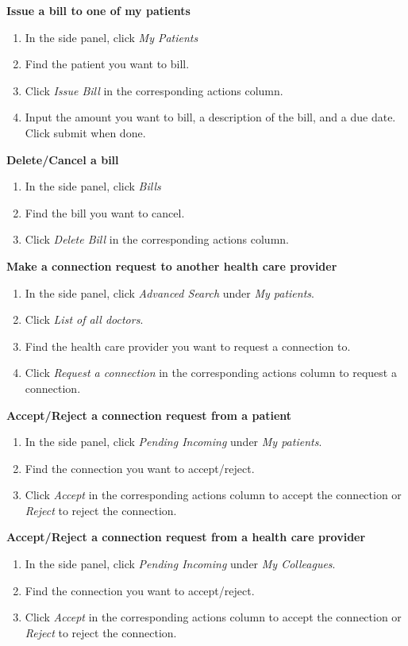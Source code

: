 \textbf{Issue a bill to one of my patients}
\begin{enumerate}
\item In the side panel, click \textit{My Patients}
\item Find the patient you want to bill. 
\item Click \textit{Issue Bill} in the corresponding actions column.
\item Input the amount you want to bill, a description of the bill, and a due date. Click submit when done.
\end{enumerate}
\textbf{Delete/Cancel a bill}
\begin{enumerate}
\item In the side panel, click \textit{Bills}
\item Find the bill you want to cancel.
\item Click \textit{Delete Bill} in the corresponding actions column.
\end{enumerate}
\textbf{Make a connection request to another health care provider}
\begin{enumerate}
\item In the side panel, click \textit{Advanced Search} under \textit{My patients}.
\item Click \textit{List of all doctors}.
\item Find the health care provider you want to request a connection to.
\item Click \textit{Request a connection} in the corresponding actions column to request a connection.
\end{enumerate}
\textbf{Accept/Reject a connection request from a patient}
\begin{enumerate}
\item In the side panel, click \textit{Pending Incoming} under \textit{My patients}.
\item Find the connection you want to accept/reject.
\item Click \textit{Accept} in the corresponding actions column to accept the connection or \textit{Reject} to reject the connection.
\end{enumerate}
\textbf{Accept/Reject a connection request from a health care provider}
\begin{enumerate}
\item In the side panel, click \textit{Pending Incoming} under \textit{My Colleagues}.
\item Find the connection you want to accept/reject.
\item Click \textit{Accept} in the corresponding actions column to accept the connection or \textit{Reject} to reject the connection.
\end{enumerate}
